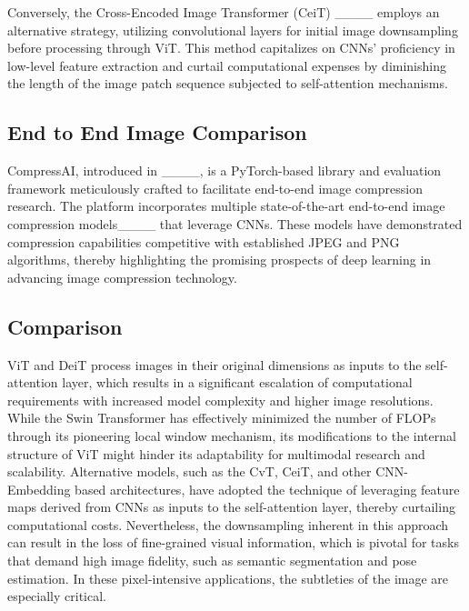 Conversely, the Cross-Encoded Image Transformer (CeiT) ____ employs an alternative strategy, 
utilizing convolutional layers for initial image downsampling before processing through ViT. 
This method capitalizes on CNNs' proficiency in low-level feature extraction and curtail computational expenses by diminishing the length of the 
image patch sequence subjected to self-attention mechanisms.

\subsection{End to End Image Comparison}
\label{subsec:end_to_end_comparison}

CompressAI, introduced in ____, is a PyTorch-based library and evaluation framework 
meticulously crafted to facilitate end-to-end image compression research.
The platform incorporates multiple state-of-the-art end-to-end image compression models____ that leverage CNNs.
These models have demonstrated compression capabilities competitive with established JPEG and PNG algorithms, 
thereby highlighting the promising prospects of deep learning in advancing image compression technology.
\subsection{Comparison}
\label{subsec:comparison}

ViT and DeiT process images in their original dimensions as inputs to the self-attention layer, 
which results in a significant escalation of computational requirements with increased model complexity and higher image resolutions.
While the Swin Transformer has effectively minimized the number of FLOPs through its pioneering local window mechanism, 
its modifications to the internal structure of ViT might hinder its adaptability for multimodal research and scalability.
Alternative models, such as the CvT, CeiT, and other CNN-Embedding based architectures, 
have adopted the technique of leveraging feature maps derived from CNNs as inputs to the self-attention layer, thereby curtailing computational costs.
Nevertheless, the downsampling inherent in this approach can result in the loss of fine-grained visual information, which is pivotal for tasks that demand high image fidelity, 
such as semantic segmentation and pose estimation. In these pixel-intensive applications, the subtleties of the image are especially critical.

